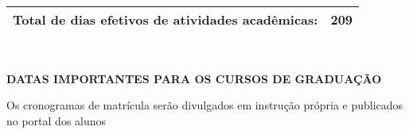 \documentclass[thesis]{hmcposter}
\begin{document}
\begin{poster}
\begin{center}
\begin{table}
{\begin{tabular}{|c|c|c|c|c|c|c|}
\multicolumn{6}{|c|}{\small \textbf{Total de dias efetivos de atividades acadêmicas:}}              & 209            \\ \hline
\end{tabular}
}
\end{table}
\null
\end{center}
\vfill
\null
\columnbreak
~
\vfill
\begin{center}
\large \textbf{DATAS IMPORTANTES PARA OS CURSOS DE GRADUAÇÃO}
\newline
\null
\newline
\begin{table}
\centering
{}
\end{table}
\newline
\null
\newline
Os cronogramas de matrícula serão divulgados em instrução própria e publicados no portal dos alunos
\end{center}
\vfill
\null

\end{poster}
\end{document}

